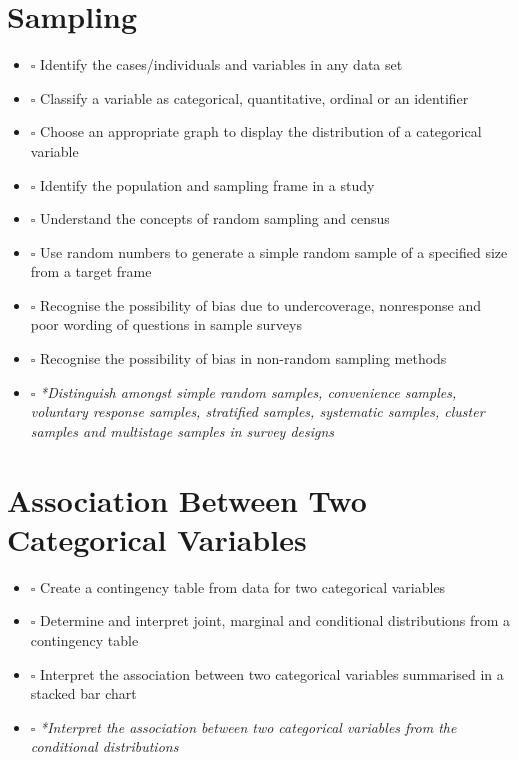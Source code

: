 \documentclass[
  11pt,
  oneside]{scrbook}
\providecommand{\tightlist}{%
  \setlength{\itemsep}{0pt}\setlength{\parskip}{0pt}}
\begin{document}
\section*{Sampling}

\begin{itemize}
\tightlist
\item
  \(\square\) Identify the cases/individuals and variables in any data set\\
\item
  \(\square\) Classify a variable as categorical, quantitative, ordinal or an identifier\\
\item
  \(\square\) Choose an appropriate graph to display the distribution of a categorical variable\\
\item
  \(\square\) Identify the population and sampling frame in a study\\
\item
  \(\square\) Understand the concepts of random sampling and census\\
\item
  \(\square\) Use random numbers to generate a simple random sample of a specified size from a target frame\\
\item
  \(\square\) Recognise the possibility of bias due to undercoverage, nonresponse and poor wording of questions in sample surveys\\
\item
  \(\square\) Recognise the possibility of bias in non-random sampling methods\\
\item
  \(\square\) \emph{*Distinguish amongst simple random samples, convenience samples, voluntary response samples, stratified samples, systematic samples, cluster samples and multistage samples in survey designs}
\end{itemize}

\section*{Association Between Two Categorical Variables}

\begin{itemize}
\tightlist
\item
  \(\square\) Create a contingency table from data for two categorical variables\\
\item
  \(\square\) Determine and interpret joint, marginal and conditional distributions from a contingency table\\
\item
  \(\square\) Interpret the association between two categorical variables summarised in a stacked bar chart\\
\item
  \(\square\) \emph{*Interpret the association between two categorical variables from the conditional distributions}
\end{itemize}
\end{document}
